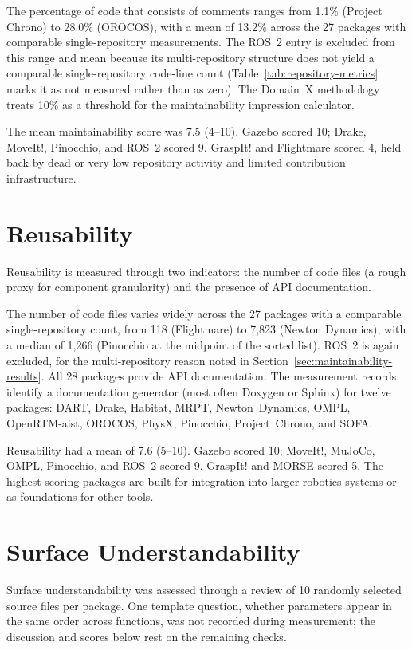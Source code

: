 The percentage of code that consists of comments ranges from 1.1\% (Project Chrono) to 28.0\% (OROCOS), with a mean of 13.2\% across the 27 packages with comparable single-repository measurements. The ROS~2 entry is excluded from this range and mean because its multi-repository structure does not yield a comparable single-repository code-line count (Table~\ref{tab:repository-metrics} marks it as not measured rather than as zero). The Domain~X methodology treats 10\% as a threshold for the maintainability impression calculator.

The mean maintainability score was 7.5 (4--10). Gazebo scored 10; Drake, MoveIt!, Pinocchio, and ROS~2 scored 9. GraspIt! and Flightmare scored 4, held back by dead or very low repository activity and limited contribution infrastructure.

\section{Reusability}
\label{sec:reusability-results}

Reusability is measured through two indicators: the number of code files (a rough proxy for component granularity) and the presence of API documentation.

The number of code files varies widely across the 27 packages with a comparable single-repository count, from 118 (Flightmare) to 7,823 (Newton Dynamics), with a median of 1,266 (Pinocchio at the midpoint of the sorted list). ROS~2 is again excluded, for the multi-repository reason noted in Section~\ref{sec:maintainability-results}. All 28 packages provide API documentation. The measurement records identify a documentation generator (most often Doxygen or Sphinx) for twelve packages: DART, Drake, Habitat, MRPT, Newton~Dynamics, OMPL, OpenRTM-aist, OROCOS, PhysX, Pinocchio, Project~Chrono, and SOFA.

Reusability had a mean of 7.6 (5--10). Gazebo scored 10; MoveIt!, MuJoCo, OMPL, Pinocchio, and ROS~2 scored 9. GraspIt! and MORSE scored 5. The highest-scoring packages are built for integration into larger robotics systems or as foundations for other tools.

\section{Surface Understandability}
\label{sec:surface-understandability-results}

Surface understandability was assessed through a review of 10 randomly selected source files per package. One template question, whether parameters appear in the same order across functions, was not recorded during measurement; the discussion and scores below rest on the remaining checks.

